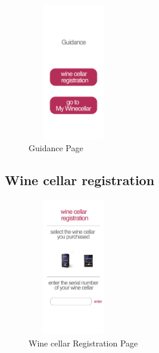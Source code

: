 \documentclass[sigconf, nonacm]{acmart}
\begin{document}
\begin{figure}
  \centering
  \includegraphics[width=4cm, height=6cm]{guidance.png}
  \caption{Guidance Page}
  \label{fig:Guidance}
\end{figure}


\noindent \subsection{Wine cellar registration}
\begin{figure}
  \centering
  \includegraphics[width=4cm, height=6cm]{winecellarregi.png}
  \caption{Wine cellar Registration Page}
  \label{fig:Wine cellar Registration Page}
\end{figure}
\end{document}

